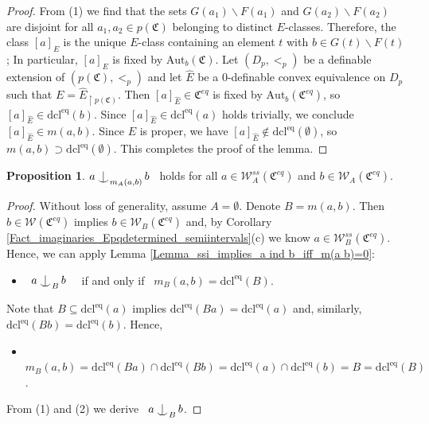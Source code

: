 \documentclass{amsart}
\theoremstyle{definition}
\newtheorem{Proposition}[Theorem]{Proposition}
\theoremstyle{definition}
\def\strok{\restriction}
\def\Ind#1#2{#1\setbox0=\hbox{$#1x$}\kern\wd0\hbox to 0pt{\hss$#1\mid$\hss}
\lower.9\ht0\hbox to 0pt{\hss$#1\smile$\hss}\kern\wd0}
\def\ind{\mathop{\mathpalette\Ind{}}}
\newcommand{\Mon}{\mathfrak C}
\newcommand{\Moneq}{\mathfrak C^{eq}}
\newcommand{\dcleq}{\mathrm{dcl^{eq}}}
\newcommand{\Aut}{\mathrm{Aut}}
\begin{document}
\begin{proof}
From (1) we find that the sets $G(a_1)\smallsetminus F(a_1)$ and $G(a_2)\smallsetminus F(a_2)$ are disjoint for all $a_1,a_2\in p(\Mon)$ belonging to distinct $E$-classes.
Therefore, the class $[a]_{E}$ is the unique $E$-class containing an element $t$ with $b\in G(t)\smallsetminus F(t)$; In particular, $[a]_{E}$ is fixed by $\Aut_b(\Mon)$. 
Let $(D_p,<_p)$ be a definable extension of $(p(\Mon),<_p)$ and let $\hat E$ be a $0$-definable convex equivalence on $D_p$ such that $E=\hat E_{\strok p(\Mon)}$. Then $[a]_{\hat E}\in \Moneq$ is fixed by $\Aut_b(\Moneq)$, so $[a]_{\hat E}\in \dcleq(b)$.
Since $[a]_{\hat E}\in\dcleq(a)$ holds trivially, we conclude $[a]_{\hat E}\in m(a,b)$. Since $E$ is proper, we have $[a]_{\hat E}\notin\dcleq(\emptyset)$, so $m(a,b)\supset\dcleq(\emptyset)$. This completes the proof of the lemma.
\end{proof}

\begin{Proposition}\label{Prop_simple_semiintervals_implies_interdef}  $a\ind_{m_A(a,b)}b$ \ holds for 
all $a\in \mathcal W_A^{ss}(\Moneq)$ and $b\in \mathcal W_A(\Moneq)$. 
\end{Proposition}
\begin{proof} Without loss of generality, assume $A=\emptyset$. Denote $B=m(a,b)$.  Then $b\in\mathcal W(\Moneq)$ implies $b\in\mathcal W_{B}(\Moneq)$ and, by Corollary \ref{Fact_imaginaries_Epqdetermined_semiintervals}(c) we know $a\in\mathcal W_{B}^{ss}(\Moneq)$. Hence, we can apply Lemma \ref{Lemma_ssi_implies_a ind b_iff_m(a b)=0}: 
\begin{itemize}
\item[(1)] \
$a\ind_{B}b$  \ \ if and only if \ $m_B(a,b)=\dcleq(B)$.
\end{itemize}
Note that $B\subseteq\dcleq(a)$ implies $\dcleq(Ba)=\dcleq(a)$ and, similarly, $\dcleq(Bb)=\dcleq(b)$. Hence, 
\begin{itemize} 
\item[(2)] \ $m_{B}(a,b)= \dcleq(Ba)\cap \dcleq(Bb)=\dcleq(a)\cap \dcleq(b)=B=\dcleq(B)$. 
\end{itemize}
From (1) and (2) we derive \ $a\ind_Bb$.
\end{proof}
\end{document}
